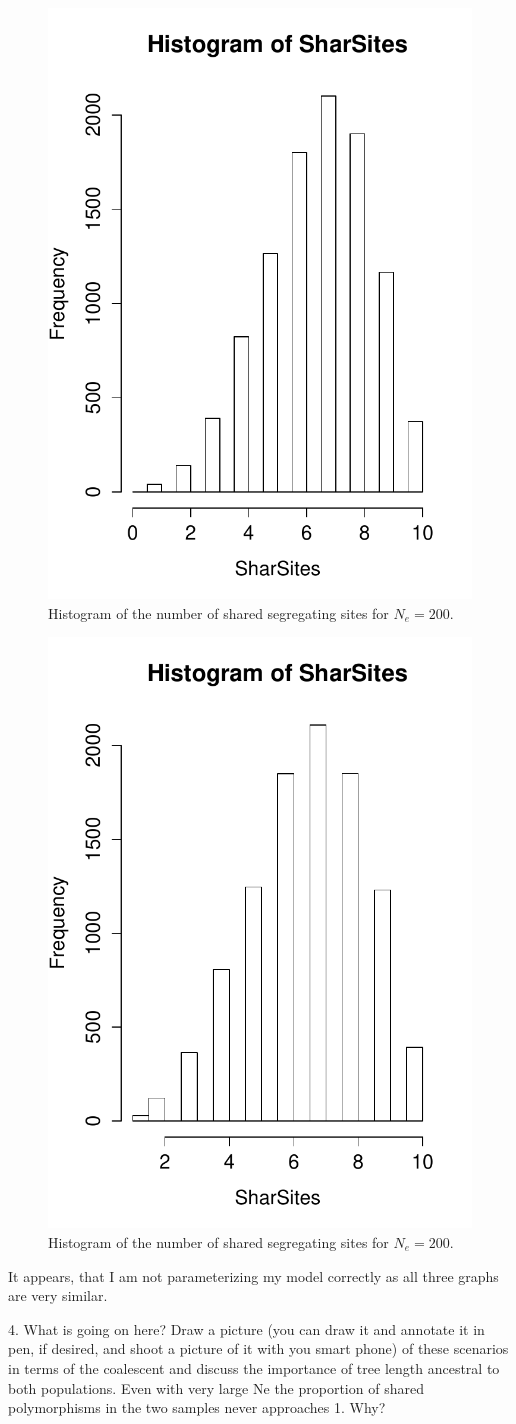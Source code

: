 \documentclass[11pt, oneside]{article}
\begin{document}
\begin{figure}
\centering
     \includegraphics[width=.5\textwidth]{Figures/Ne25Hist.pdf}
    \caption{Histogram of the number of shared segregating sites for $N_e = 200$. }\label{fig:SegSites}
\end{figure}

\begin{figure}
\centering
     \includegraphics[width=.5\textwidth]{Figures/Ne50000Hist.pdf}
    \caption{Histogram of the number of shared segregating sites for $N_e = 200$. }\label{fig:SegSites}
\end{figure}

It appears, that I am not parameterizing my model correctly as all three graphs are very similar.

4. What is going on here? Draw a picture (you can draw it and annotate it in pen, if desired, and shoot a picture of it with you smart phone) of these scenarios in terms of the coalescent and discuss the importance of tree length ancestral to both populations. Even with very large Ne the proportion of shared polymorphisms in the two samples never approaches 1. Why?\\
\end{document}
